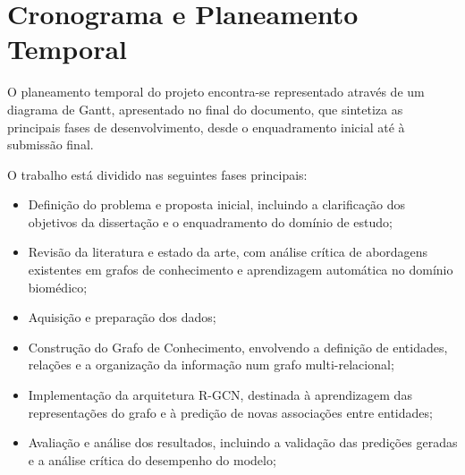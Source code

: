 \section{Cronograma e Planeamento Temporal}
\label{sec:cronograma}

O planeamento temporal do projeto encontra-se representado através de um diagrama de Gantt, apresentado no final do documento, que sintetiza as principais fases de desenvolvimento, desde o enquadramento inicial até à submissão final.

O trabalho está dividido nas seguintes fases principais:
\begin{itemize}
    \item Definição do problema e proposta inicial, incluindo a clarificação dos objetivos da dissertação e o enquadramento do domínio de estudo;
    \item Revisão da literatura e estado da arte, com análise crítica de abordagens existentes em grafos de conhecimento e aprendizagem automática no domínio biomédico;
    \item Aquisição e preparação dos dados;
    \item Construção do Grafo de Conhecimento, envolvendo a definição de entidades, relações e a organização da informação num grafo multi-relacional;
    \item Implementação da arquitetura R-GCN, destinada à aprendizagem das representações do grafo e à predição de novas associações entre entidades;
    \item Avaliação e análise dos resultados, incluindo a validação das predições geradas e a análise crítica do desempenho do modelo;
\end{itemize}

